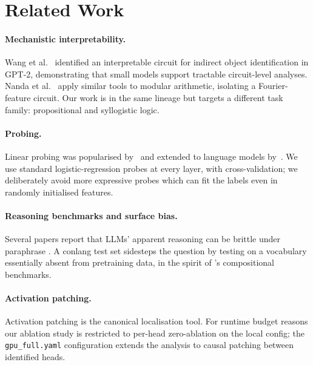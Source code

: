 \section{Related Work}
\paragraph{Mechanistic interpretability.} Wang et al.~\cite{wang2022interpret}
identified an interpretable circuit for indirect object identification in
GPT-2, demonstrating that small models support tractable circuit-level
analyses. Nanda et al.~\cite{nanda2023progress} apply similar tools to
modular arithmetic, isolating a Fourier-feature circuit. Our work is in the
same lineage but targets a different task family: propositional and
syllogistic logic.

\paragraph{Probing.} Linear probing was popularised
by~\cite{alain2017understanding} and extended to language models
by~\cite{hewitt2019structural}. We use standard logistic-regression probes
at every layer, with cross-validation; we deliberately avoid more expressive
probes which can fit the labels even in randomly initialised features.

\paragraph{Reasoning benchmarks and surface bias.} Several papers report
that LLMs' apparent reasoning can be brittle under paraphrase
\cite{webson2022prompt}. A conlang test set sidesteps the question by
testing on a vocabulary essentially absent from pretraining data, in the
spirit of \cite{lake2023human}'s compositional benchmarks.

\paragraph{Activation patching.} Activation patching \cite{meng2022locating}
is the canonical localisation tool. For runtime budget reasons our ablation
study is restricted to per-head zero-ablation on the local config; the
\texttt{gpu\_full.yaml} configuration extends the analysis to causal
patching between identified heads.
